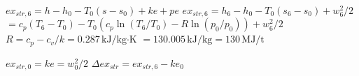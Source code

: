 \( ex_{str,6} = h - h_0 - T_0(s - s_0) + ke + pe \)  
\( ex_{str,6} = h_6 - h_0 - T_0(s_6 - s_0) + w_6^2 / 2 \)  
\( = c_p(T_6 - T_0) - T_0(c_p \ln(T_6 / T_0) - R \ln(p_0 / p_0)) + w_6^2 / 2 \)  
\( R = c_p - c_v / k = 0.287 \, \text{kJ/kg·K} \)  
\( = 130.005 \, \text{kJ/kg} = 130 \, \text{MJ/t} \)  

\( ex_{str,0} = ke = w_0^2 / 2 \)  
\( \Delta ex_{str} = ex_{str,6} - ke_0 \)